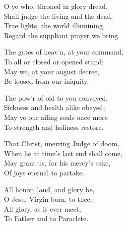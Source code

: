 \begin{multicols}{2}
	O ye who, throned in glory dread,\\
	Shall judge the living and the dead,\\
	True lights, the world illumining,\\
	Regard the suppliant prayer we bring.
	
	The gates of heav'n, at your command,\\
	To all or closed or opened stand:\\
	May we, at your august decree,\\
	Be loosed from our iniquity.
	
	The pow'r of old to you conveyed,\\
	Sickness and health alike obeyed;\\
	May ye our ailing souls once more\\
	To strength and holiness restore.
	
	That Christ, unerring Judge of doom,\\
	When he at time's last end shall come,\\
	May grant us, for his mercy's sake,\\
	Of joys eternal to partake.
	
	All honor, laud, and glory be,\\
	O Jesu, Virgin-born, to thee;\\
	All glory, as is ever meet,\\
	To Father and to Paraclete. 
\end{multicols}